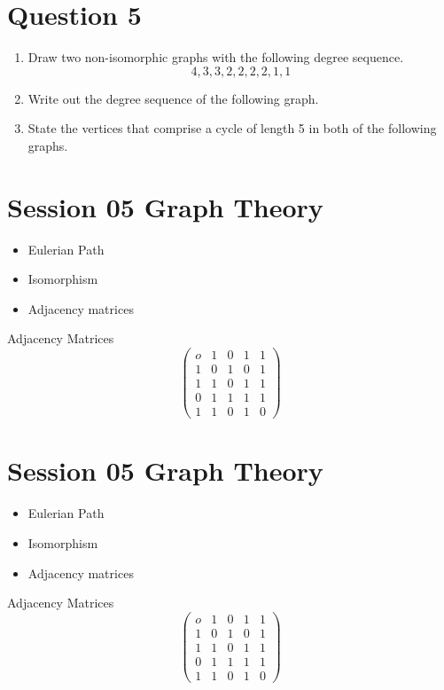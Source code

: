 \documentclass[]{report}
\begin{document}
\section*{Question 5}
\begin{enumerate}
	\item Draw two non-isomorphic graphs with the following degree sequence.
	\[ 4,3,3,2,2,2,2,1,1\]
	\item Write out the degree sequence of the following graph.
	\item State the vertices that comprise a cycle of length 5 in both of the following graphs.
\end{enumerate}









\section*{Session 05 Graph Theory}
\begin{itemize}
	\item Eulerian Path
	\item Isomorphism
	\item Adjacency matrices
\end{itemize}
Adjacency Matrices
\[ \left( \begin{matrix}
o & 1 & 0 & 1 & 1 \\ 
1 & 0 & 1 & 0 & 1 \\ 
1 & 1 & 0 & 1 & 1 \\ 
0 & 1 & 1 & 1 & 1 \\ 
1 & 1 & 0 & 1 & 0
\end{matrix} \right) \]


\section*{Session 05 Graph Theory}
\begin{itemize}
	\item Eulerian Path
	\item Isomorphism
	\item Adjacency matrices
\end{itemize}
Adjacency Matrices
\[ \left( \begin{matrix}
o & 1 & 0 & 1 & 1 \\ 
1 & 0 & 1 & 0 & 1 \\ 
1 & 1 & 0 & 1 & 1 \\ 
0 & 1 & 1 & 1 & 1 \\ 
1 & 1 & 0 & 1 & 0
\end{matrix} \right) \]
\end{document}
